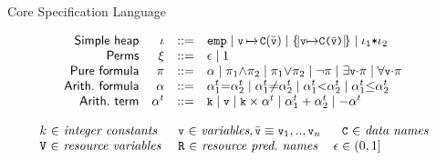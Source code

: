 \begin{frame}{Core Specification Language}
\begin{small}
\begin{center}
\[\begin{array}{rrll}
\!\!\!\!\textsf{Simple~heap}
& \!\! \aheap & {::=} &
\emp
\mid \permsto{\code{v}}{\code{C}(\vlist{v})}{}%
\mid \LOCAL{\code{v}}{\code{C}(\vlist{v})}
\mid \aheap_1 \sep \aheap_2 
\\
\!\!\!\!\textsf{Perms}
& {\grammarPerm}
& {::=} & \fracperm \mid 1 \\
\!\!\!\!\textsf{Pure~formula}
& \pure & {::=} & \arith \mid \pure_1
{\wedge} \pure_2 \mid \pure_1 {\vee} \pure_2 \mid {\neg} \pure
\mid {\exists} \code{v} {\cdot} \pure \mid {\forall} \code{v} {\cdot} \pure\\
\!\!\!\!\textsf{Arith.~formula}
& \arith & {::=} & \aterm_1 {=} \aterm_2 \mid \aterm_1 {\neq} \aterm_2 \mid 
			\aterm_1 {<} \aterm_2 \mid \aterm_1 {\leq} \aterm_2  \\
\!\!\!\!\textsf{Arith.~term} 
& \aterm & {::=} & \code{k} \mid \code{v} \mid \code{k} \times \aterm \mid
\aterm_1 + \aterm_2 \mid -\aterm  
  \end{array}
\]
  \end{center}
  \end{small}
  \[
\begin{array}{lll}
\!\!\! k ~{\in}~ \myit{integer~constants} &%
\code{v} ~{\in}~ \myit{variables} , \vlist{v} \veq \code{v}_1,..,\code{v}_n
& %
~~\code{C} ~{\in}~ \myit{data~names}  %
\\
\!\!\! \rsrvar ~ {\in}~ \myit{resource~variables~} & 
\btt{R}~{\in}~ \myit{resource~pred.~names}  & \sm{\fracperm}\in (0,1]%


\end{array}
\]

\end{frame}
